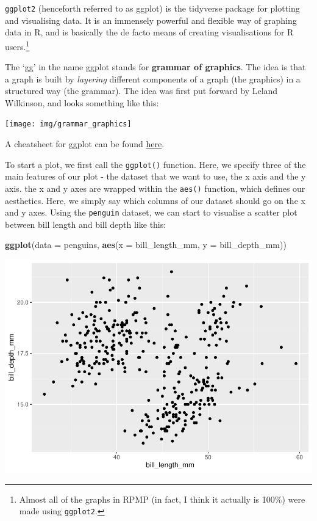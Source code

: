 \documentclass[
]{book}
\newenvironment{Shaded}{\begin{snugshade}}{\end{snugshade}}
\newcommand{\AttributeTok}[1]{\textcolor[rgb]{0.13,0.29,0.53}{#1}}
\newcommand{\FunctionTok}[1]{\textcolor[rgb]{0.13,0.29,0.53}{\textbf{#1}}}
\newcommand{\NormalTok}[1]{#1}
\begin{document}
\texttt{ggplot2} (henceforth referred to as ggplot) is the tidyverse package for plotting and visualising data. It is an immensely powerful and flexible way of graphing data in R, and is basically the de facto means of creating visualisations for R users.\footnote{Almost all of the graphs in RPMP (in fact, I think it actually is 100\%) were made using \texttt{ggplot2}.}

The `gg' in the name ggplot stands for \textbf{grammar of graphics}. The idea is that a graph is built by \emph{layering} different components of a graph (the graphics) in a structured way (the grammar). The idea was first put forward by Leland Wilkinson, and looks something like this:

\begin{center}\texttt{[image: img/grammar\_graphics]} \end{center}

A cheatsheet for ggplot can be found \href{https://rstudio.github.io/cheatsheets/html/data-visualization.html}{here}.

To start a plot, we first call the \texttt{ggplot()} function. Here, we specify three of the main features of our plot - the dataset that we want to use, the x axis and the y axis. the x and y axes are wrapped within the \texttt{aes()} function, which defines our aesthetics. Here, we simply say which columns of our dataset should go on the x and y axes. Using the \texttt{penguin} dataset, we can start to visualise a scatter plot between bill length and bill depth like this:

\begin{Shaded}
\begin{Highlighting}[]
\FunctionTok{ggplot}\NormalTok{(}\AttributeTok{data =}\NormalTok{ penguins, }\FunctionTok{aes}\NormalTok{(}\AttributeTok{x =}\NormalTok{ bill\_length\_mm, }\AttributeTok{y =}\NormalTok{ bill\_depth\_mm))}
\end{Highlighting}
\end{Shaded}

\includegraphics{_main_files/figure-latex/unnamed-chunk-52-1.pdf}
\end{document}
